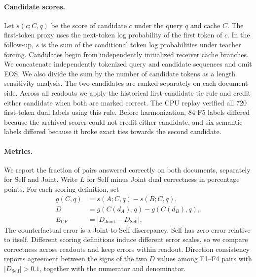 \documentclass[10pt]{article}
\begin{document}
\paragraph{Candidate scores.}
Let $s(c;C,q)$ be the score of candidate $c$ under the query $q$ and cache $C$. The first-token proxy uses the next-token log probability of the first token of $c$. In the follow-up, $s$ is the sum of the conditional token log probabilities under teacher forcing. Candidates begin from independently initialized receiver cache branches. We concatenate independently tokenized query and candidate sequences and omit EOS. We also divide the sum by the number of candidate tokens as a length sensitivity analysis. The two candidates are ranked separately on each document side. Across all readouts we apply the historical first-candidate tie rule and credit either candidate when both are marked correct. The CPU replay verified all 720 first-token dual labels using this rule. Before harmonization, 84 F5 labels differed because the archived scorer could not credit either candidate, and six semantic labels differed because it broke exact ties towards the second candidate.

\paragraph{Metrics.}
We report the fraction of pairs answered correctly on both documents, separately for Self and Joint. Write $L$ for Self minus Joint dual correctness in percentage points. For each scoring definition, set
\begin{align}
g(C,q) &= s(A; C,q)-s(B; C,q), \\
D &= g(C(d_A),q)-g(C(d_B),q),\\
E_{\mathrm{CF}} &= |D_{\mathrm{Joint}}-D_{\mathrm{Self}}|.
\end{align}
The counterfactual error is a Joint-to-Self discrepancy. Self has zero error relative to itself. Different scoring definitions induce different error scales, so we compare correctness across readouts and keep errors within readout. Direction consistency reports agreement between the signs of the two $D$ values among F1--F4 pairs with $|D_{\mathrm{Self}}|>0.1$, together with the numerator and denominator.
\end{document}
